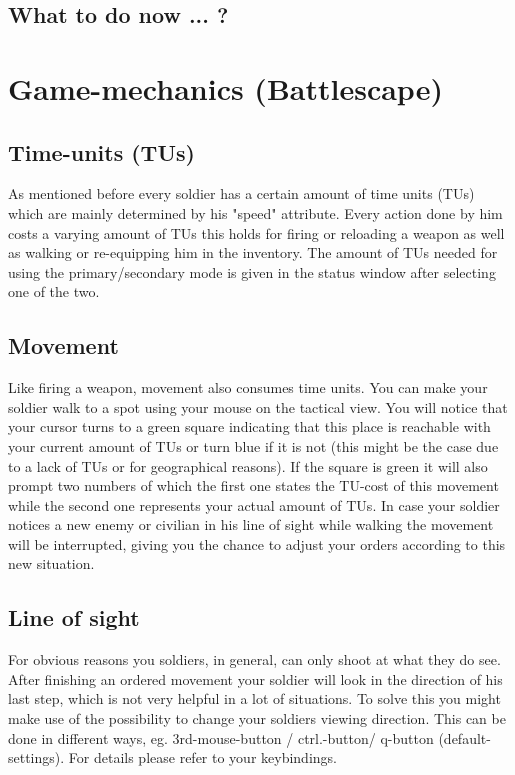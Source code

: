\subsection{What to do now ... ?}

\section{Game-mechanics (Battlescape)}

\subsection{Time-units (TUs)}
As mentioned before every soldier has a certain amount of time units (TUs) which are mainly determined by his "speed" attribute. Every action done by him costs a varying amount of TUs this holds for firing or reloading a weapon as well as walking or re-equipping him in the inventory. The amount of TUs needed for using the primary/secondary mode is given in the status window after selecting one of the two.

\subsection{Movement}
Like firing a weapon, movement also consumes time units. You can make your soldier walk to a spot using your mouse on the tactical view. You will notice that your cursor turns to a green square indicating that this place is reachable with your current amount of TUs or turn blue if it is not (this might be the case due to a lack of TUs or for geographical reasons). If the square is green it will also prompt two numbers of which the first one states the TU-cost of this movement while the second one represents your actual amount of TUs. In case your soldier notices a new enemy or civilian in his line of sight while walking the movement will be interrupted, giving you the chance to adjust your orders according to this new situation.

\subsection{Line of sight}
For obvious reasons you soldiers, in general, can only shoot at what they do see. After finishing an ordered movement your soldier will look in the direction of his last step, which is not very helpful in a lot of situations. To solve this you might make use of the possibility to change your soldiers viewing direction. This can be done in different ways, eg. 3rd-mouse-button / ctrl.-button/ q-button (default-settings). For details please refer to your keybindings. 
